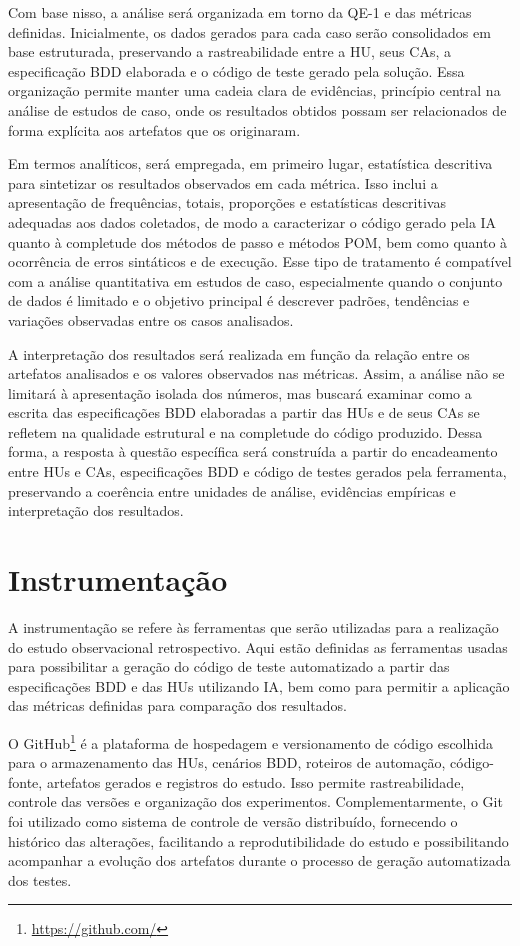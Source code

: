 Com base nisso, a análise será organizada em torno da QE-1 e das métricas definidas. Inicialmente, os dados gerados para cada caso serão consolidados em base estruturada, preservando a rastreabilidade entre a HU, seus CAs, a especificação BDD elaborada e o código de teste gerado pela solução. Essa organização permite manter uma cadeia clara de evidências, princípio central na análise de estudos de caso, onde os resultados obtidos possam ser relacionados de forma explícita aos artefatos que os originaram.

Em termos analíticos, será empregada, em primeiro lugar, estatística descritiva para sintetizar os resultados observados em cada métrica. Isso inclui a apresentação de frequências, totais, proporções e estatísticas descritivas adequadas aos dados coletados, de modo a caracterizar o código gerado pela IA quanto à completude dos métodos de passo e métodos POM, bem como quanto à ocorrência de erros sintáticos e de execução. Esse tipo de tratamento é compatível com a análise quantitativa em estudos de caso, especialmente quando o conjunto de dados é limitado e o objetivo principal é descrever padrões, tendências e variações observadas entre os casos analisados.

A interpretação dos resultados será realizada em função da relação entre os artefatos analisados e os valores observados nas métricas. Assim, a análise não se limitará à apresentação isolada dos números, mas buscará examinar como a escrita das especificações BDD elaboradas a partir das HUs e de seus CAs se refletem na qualidade estrutural e na completude do código produzido. Dessa forma, a resposta à questão específica será construída a partir do encadeamento entre HUs e CAs, especificações BDD e código de testes gerados pela ferramenta, preservando a coerência entre unidades de análise, evidências empíricas e interpretação dos resultados.

\section{Instrumentação}

A instrumentação se refere às ferramentas que serão utilizadas para a realização do estudo observacional retrospectivo. Aqui estão definidas as ferramentas usadas para possibilitar a geração do código de teste automatizado a partir das especificações BDD e das HUs utilizando IA, bem como para permitir a aplicação das métricas definidas para comparação dos resultados.

O GitHub\footnote{\url{https://github.com/}} é a plataforma de hospedagem e versionamento de código escolhida para o armazenamento das HUs, cenários BDD, roteiros de automação, código-fonte, artefatos gerados e registros do estudo. Isso permite rastreabilidade, controle das versões e organização dos experimentos. Complementarmente, o Git foi utilizado como sistema de controle de versão distribuído, fornecendo o histórico das alterações, facilitando a reprodutibilidade do estudo e possibilitando acompanhar a evolução dos artefatos durante o processo de geração automatizada dos testes.

